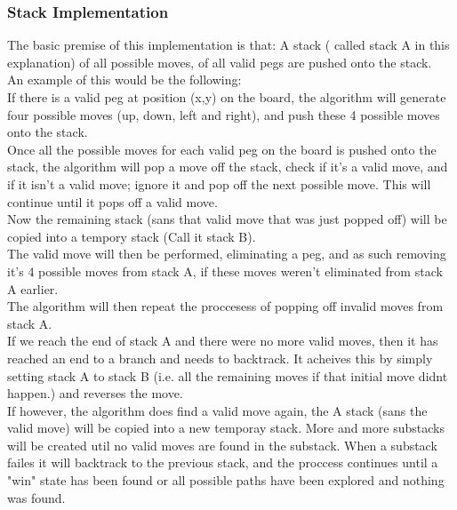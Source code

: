 \documentclass[a4paper]{article}
\begin{document}
\subsubsection{Stack Implementation}
The basic premise of this implementation is that: A stack ( called stack A in this explanation) of all possible moves, of all valid pegs are pushed onto the stack.\\
An example of this would be the following:\\
If there is a valid peg at position (x,y) on the board, the algorithm will generate four possible moves (up, down, left and right), and push these 4 possible moves onto the stack.\\
Once all the possible moves for each valid peg on the board is pushed onto the stack, the algorithm will pop a move off the stack, check if it's a valid move, and if it isn't a valid move; ignore it and pop off the next possible move. This will continue until it pops off a valid move.\\
Now the remaining stack (sans that valid move that was just popped off) will be copied into a tempory stack (Call it stack B).\\
The valid move will then be performed, eliminating a peg, and as such removing it's 4 possible moves from stack A, if these moves weren't eliminated from stack A earlier.\\
The algorithm will then repeat  the proccesess of popping off invalid moves from stack A.\\
If we reach the end of stack A and there were no more valid moves, then it has reached an end to a branch and needs to backtrack. It acheives this by simply setting stack A to stack B (i.e. all the remaining moves if that initial move didnt happen.) and reverses the move.\\
If however, the algorithm does find a valid move again, the A stack (sans the valid move) will be copied into a new temporay stack. More and more substacks will be created util no valid moves are found in the substack. When a substack failes it will backtrack to the previous stack, and the proccess continues until a "win" state has been found or all possible paths have been explored and nothing was found.\\\
\end{document}
